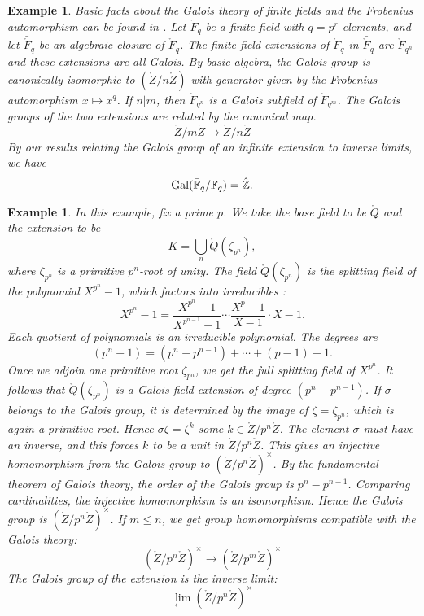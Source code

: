 \documentclass{amsart}
\newtheorem{example}[exercise]{Example}
\def\oG{\op{Gal}}
\begin{document}
\begin{example}  
Basic facts about the Galois theory of finite fields and the Frobenius
automorphism can be found in
\cite[Chapter~IX,Prop.~9.40]{knapp-basic}.
Let $\ring{F}_q$ be a finite field with $q=p^r$ elements, and
let $\bar{\ring{F}}_q$ be an algebraic closure of $\ring{F}_q$.
The finite field extensions of $\ring{F}_q$ in $\bar{\ring{F}}_q$
are $\ring{F}_{q^n}$ and these extensions are all Galois.  
By basic algebra, the Galois group is
canonically isomorphic to $(\ring{Z}/n\ring{Z})$ with generator given by the
Frobenius automorphism $x\mapsto x^q$.  If $n|m$, then $\ring{F}_{q^n}$ is a Galois subfield
of $\ring{F}_{q^m}$.   The Galois groups of the two extensions are related by
the canonical map.
\[
\ring{Z}/m\ring{Z} \to \ring{Z}/n\ring{Z}
\]
By our results relating the Galois group of an infinite extension to inverse limits, we
have
\[
\oG(\bar{\ring{F}}_q/\ring{F}_q) = \hat{\ring{Z}}.
\]
\end{example}

\begin{example} In this example, fix a prime $p$.
We take the base field to be $\ring{Q}$ and
the extension to be 
\[
K=\bigcup_n \ring{Q}(\zeta_{p^n}),
\]
where $\zeta_{p^n}$ is a primitive $p^n$-root of unity.
The field $\ring{Q}(\zeta_{p^n})$ is the splitting field of the polynomial $X^{p^n}-1$,
which factors into irreducibles \cite[Lemma~9.42]{knapp-basic}:
\[
X^{p^n}-1 = \frac{X^{p^n}-1}{X^{p^{n-1}}-1}\cdots \frac{X^p-1}{X-1} \cdot {X-1}.
\]
Each quotient of polynomials is an irreducible polynomial.  The degrees are
\[
(p^n-1) = (p^n-p^{n-1}) + \cdots + (p-1) + 1.
\]
Once we adjoin one primitive root $\zeta_{p^n}$, we get the full
splitting field of $X^{p^n}$.  It follows that $\ring{Q}(\zeta_{p^n})$
is a Galois field extension of degree $(p^n-p^{n-1})$.  If $\sigma$
belongs to the Galois group, it is determined by the image of
$\zeta=\zeta_{p^n}$, which is again a primitive root.  Hence
$\sigma\zeta = \zeta^k$ some $k\in\ring{Z}/p^n\ring{Z}$.  The element
$\sigma$ must have an inverse, and this forces $k$ to be a unit in
$\ring{Z}/p^n\ring{Z}$.  This gives an injective homomorphism from the
Galois group to $(\ring{Z}/p^n\ring{Z})^\times$.  By the fundamental
theorem of Galois theory, the order of the Galois group is $p^n
-p^{n-1}$. Comparing cardinalities, the injective homomorphism is an
isomorphism.  Hence the Galois group is
$(\ring{Z}/p^n\ring{Z})^\times$.  If $m\le n$, we get group
homomorphisms compatible with the Galois theory:
\[
(\ring{Z}/p^n\ring{Z})^\times \to (\ring{Z}/p^m\ring{Z})^\times
\]
The Galois group of the extension is the inverse limit:
\[
\lim_{\leftarrow} (\ring{Z}/p^n\ring{Z})^\times
\]
\end{example}
\end{document}
